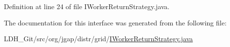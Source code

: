 Definition at line 24 of file I\-Worker\-Return\-Strategy.\-java.



The documentation for this interface was generated from the following file\-:\begin{DoxyCompactItemize}
\item 
L\-D\-H\-\_\-\-Git/src/org/jgap/distr/grid/\hyperlink{_i_worker_return_strategy_8java}{I\-Worker\-Return\-Strategy.\-java}\end{DoxyCompactItemize}
